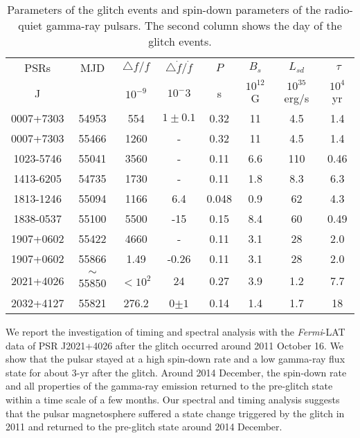 \documentclass[12pt,preprint]{aastex}
\begin{document}
\begin{table}
\begin{tabular}{cccccccc}
  \hline\hline
  PSRs & MJD & $\triangle f/f$ & $\triangle \dot{f}/\dot{f}$ & $P$ & $B_s$ &$L_{sd}$ & $\
  \tau$ \\
  J &  & $10^{-9}$ & $10^-3$ & s & $10^{12}$G &$10^{35}$erg/s & $10^4$yr \\
  \hline
  0007+7303 & 54953 & 554 & $1\pm 0.1$ & 0.32 &11 & 4.5 & 1.4 \\
  0007+7303 & 55466 & 1260 & - &  0.32 &11 &4.5 & 1.4 \\
  1023-5746 & 55041 & 3560 & - & 0.11 &6.6 & 110 & 0.46 \\
  1413-6205 & 54735 & 1730 & - &0.11  &1.8 & 8.3 & 6.3 \\
  1813-1246 & 55094 & 1166 & 6.4 & 0.048 & 0.9 &62  & 4.3 \\
  1838-0537 & 55100 & 5500 & -15 & 0.15 &  8.4&60 & 0.49 \\
  1907+0602 & 55422 & 4660 & - & 0.11 &3.1 & 28 & 2.0 \\
  1907+0602 & 55866 & 1.49 & -0.26 & 0.11 &3.1 & 28  & 2.0 \\
  2021+4026 & $\sim$ 55850 & $<10^{2}$ &24 & 0.27& 3.9&1.2  & 7.7 \\
  2032+4127 & 55821 & 276.2 & 0$\pm 1$ & 0.14 &1.4& 1.7 & 18 \\
  \hline
\end{tabular}
\caption{Parameters of the glitch events and spin-down parameters of the radio-quiet gamma-ray
pulsars. The second column shows the day of the glitch events.}
\end{table}
We report the investigation of timing and spectral analysis with the \emph{Fermi}-LAT data of PSR J2021+4026 after the glitch occurred around 2011 October 16. We show that the pulsar stayed at a high spin-down
rate  and a low gamma-ray
flux state for about 3-yr after the glitch.
Around 2014 December, the spin-down rate and all properties of the gamma-ray emission returned to the pre-glitch state within a time scale of a few months. Our spectral and timing analysis suggests that
the pulsar magnetosphere suffered a state change triggered  by the glitch in 2011 and returned to the pre-glitch state around 2014 December. 
\end{document}
